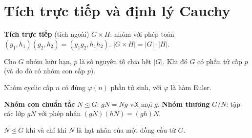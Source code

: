 \documentclass[12pt,a4paper]{article}
\begin{document}
\section{Tích trực tiếp và định lý Cauchy}

\begin{dinhnghia}
  \textbf{Tích trực tiếp} (tích ngoài) $G \times H$: nhóm với phép toán $(g_1, h_1)(g_2, h_2) = (g_1 g_2, h_1 h_2)$. $|G \times H| = |G| \cdot |H|$.
\end{dinhnghia}

\begin{dinhly}[title={Định lý Cauchy}]
  Cho $G$ nhóm hữu hạn, $p$ là số nguyên tố chia hết $|G|$. Khi đó $G$ có phần tử cấp $p$ (và do đó có nhóm con cấp $p$).
\end{dinhly}

\begin{dinhly}[title={Định lý cấp nhóm cyclic}]
  Nhóm cyclic cấp $n$ có đúng $\varphi(n)$ phần tử sinh, với $\varphi$ là hàm Euler.
\end{dinhly}

\begin{dinhnghia}
  \textbf{Nhóm con chuẩn tắc} $N \trianglelefteq G$: $gN = Ng$ với mọi $g$. \textbf{Nhóm thương} $G/N$: tập các lớp $gN$ với phép nhân $(gN)(hN) = (gh)N$.
\end{dinhnghia}

\begin{dinhly}
  $N \trianglelefteq G$ khi và chỉ khi $N$ là hạt nhân của một đồng cấu từ $G$.
\end{dinhly}
\end{document}
